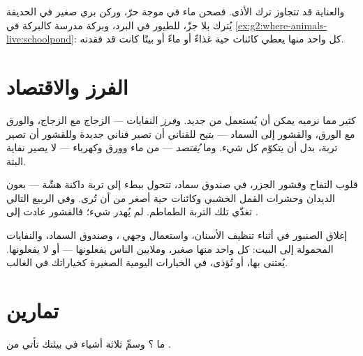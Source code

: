 \begin{example}\label{ex:g2:caring-for-nature:help}
والعناية قد تتجاوز ترك الأذى. فصحن ماء في موجة حرّ، وركن بري صغير
في الحديقة يُترك بلا جزّ،  للطيور في البرد، وبركة مدرسة
كالبركة في \cref{ex:g2:where-animals-live:schoolpond}: كل واحد
منها يعطي كائنات حية غذاءً أو ماءً أو بيتًا كانت قد فقدته.
\end{example}

\section{الفرز والاقتصاد}

\begin{proposition}\label{prop:g2:caring-for-nature:recycle}
كثير مما نرميه يمكن أن يُستعمل من جديد.
و\emph{فرز} النفايات --- الزجاج مع الزجاج،
والورق مع الورق، والقشور إلى السماد --- يتيح للقناني أن تصير
قناني جديدة وللقشور أن تصير تربة، بدل أن يتكوّم كل شيء. وما
\emph{يُقتصد} --- من ماء وورق وكهرباء --- لا يصير نفاية البتة.
\end{proposition}
\admitted

\begin{example}\label{ex:g2:caring-for-nature:compost}
قلوب التفاح وقشور الجزر، في صندوق سماد، تتحول ببطء إلى تربة داكنة
هشّة --- بعون الديدان وحشرات القمل الخشبي وكائنات حية أصغر من أن
تُرى. وفي الربيع التالي تغذّي تلك التربة الطماطم. لم يُهدر شيء؛
فالقشور عادت إلى .
\end{example}

\begin{remark}\label{rem:g2:caring-for-nature:count}
إغلاق الصنبور في أثناء تنظيف الأسنان، واستعمال وجهي ، وصندوق
السماد، والنفايات المحمولة إلى البيت: كل واحد منها صغير، وملايين
الناس يفعلونها --- أو لا يفعلونها.  يُعتنى بها، أو تُؤذى،
في الخيارات اليومية الصغيرة كخياراتك في الغالب.
\end{remark}

\section{تمارين}

\begin{exercise}[$\star$]\label{exo:g2:caring-for-nature:1}
ما  ؟ وسمِّ ثلاثة أشياء في بيئتك تأتي من .
\end{exercise}

